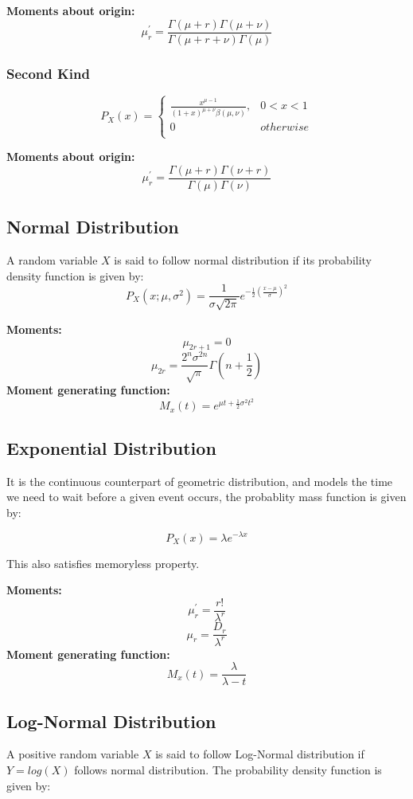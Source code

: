 \documentclass{article}
\begin{document}
\textbf{Moments about origin:}$$\mu_r^\prime = \frac{\Gamma(\mu + r)\Gamma(\mu + \nu)}{\Gamma (\mu + r + \nu) \Gamma (\mu)}$$


\subsubsection{Second Kind}
$$ P_X(x)=\left\{
\begin{array}{ll}
     \frac{x^{\mu-1}}{(1+x)^{\mu + \nu} \beta (\mu, \nu)}, & 0 < x < 1 \\
      0 & otherwise \\
\end{array} 
\right .$$

\textbf{Moments about origin:}$$\mu_r^\prime = \frac{\Gamma(\mu + r) \Gamma(\nu + r)}{\Gamma (\mu) \Gamma (\nu)}$$


\subsection{Normal Distribution}
A random variable $X$ is said to follow normal distribution if its probability density function is given by: \\

$$P_X(x; \mu, \sigma^2) = \frac{1}{\sigma \sqrt{2\pi}}e^{-\frac{1}{2}(\frac{x-\mu}{\sigma})^2}$$


\textbf{Moments:} 
$$\mu_{2r+1} = 0$$
$$\mu_{2r} = \frac{2^n \sigma^{2n}}{\sqrt{\pi}}\Gamma\left(n+\frac{1}{2}\right)$$
\textbf{Moment generating function:} $$M_x(t)=e^{\mu t + \frac{1}{2}\sigma^2 t^2}$$


\subsection{Exponential Distribution}
It is the continuous counterpart of geometric distribution, and models the time we need to wait before a given event occurs, the probablity mass function is given by:

$$P_X(x) = \lambda e^{-\lambda x}$$

This also satisfies memoryless property.

\textbf{Moments:} 
$$\mu_r^\prime=\frac{r!}{\lambda^r}$$
$$\mu_r=\frac{D_r}{\lambda^r}$$   
\textbf{Moment generating function:} $$M_x(t)=\frac{\lambda}{\lambda - t}$$

\subsection{Log-Normal Distribution}
A positive random variable  $X$ is said to follow Log-Normal distribution if $Y=log(X)$ follows normal distribution. The probability density function is given by:
\end{document}
